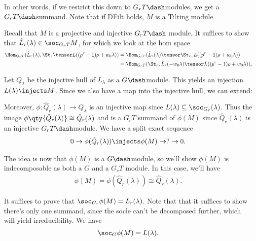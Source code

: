 In other words, if we restrict this down to \(G_r T\dash\)modules, we
get a \(G_r T\dash\)summand. Note that if DFilt holds, \(M\) is a
Tilting module.

Recall that \(M\) is a projective and injective \(G_r T\dash\) module.
It suffices to show that \(\hat{L}_r(\lambda)\in \soc_{G_r T} M\), for
which we look at the hom space
\begin{align*}  
\Hom_{G_r T} (\hat{L}_r(\lambda), \St_r \tensor L( (p^r-1)\rho + w_0 \lambda ) )
&= \Hom_{G_r T} (\hat{L}_r(\lambda) \tensor \St_r, L( (p^r-1)\rho + w_0 \lambda ) ) \\
&= \Hom_{G_r T} (\St_r, \hat{L}_r(-w_0 \lambda) \tensor L( (p^r-1)\rho + w_0 \lambda ) ) 
,\end{align*}


Let \(Q_\lambda\) be the injective hull of \(L_\lambda\) as a
\(G\dash\)module. This yields an injection \(L(\lambda)\injects M\).
Since we also have a map into the injective hull, we can extend:

\begin{center}\end{center}

Moreover, \(\phi:\hat{Q}_r(\lambda)\to Q_\lambda\) is an injective map
since \(L(\lambda) \subseteq \soc_{G_r}(\lambda)\). Thus the image
\(\phi\qty{\hat{Q}_r(\lambda) } \cong \hat{Q}_r(\lambda)\) and is a
\(G_r T\) summand of \(\phi(M)\) since \(\hat{Q}_r(\lambda)\) is an
injective \(G_r T\dash\)module. We have a split exact sequence
\begin{align*}  
0 \to \phi(\hat{Q}_r(\lambda)) \injects \phi(M) \to ? \to 0
.\end{align*}

The idea is now that \(\phi(M)\) is a \(G\dash\)module, so we'll show
\(\phi(M)\) is indecomposable as both a \(G\) and a \(G_r T\) module. In
this case, we'll have
\begin{align*}  
\phi(M) = \phi(\hat{Q}_r(\lambda)) \cong \hat{Q}_r(\lambda)
.\end{align*}

It suffices to prove that \(\soc_{G_r} \phi(M) = L_r(\lambda)\). Note
that that it suffices to show there's only one summand, since the socle
can't be decomposed further, which will yield irreducibility. We have
\begin{align*}  
\soc_G \phi(M) = L(\lambda)
.\end{align*}

